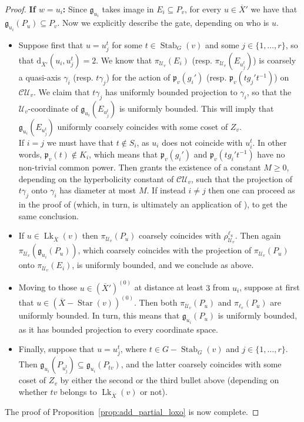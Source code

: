 \documentclass[svgnames]{amsart}
\theoremstyle{plain}
\theoremstyle{definition}
\newcommand{\C}{\mathcal C}
\newcommand{\ov}[1]{\overline{#1}}
\newcommand{\U}{\mathcal{U}}
\newcommand{\dist}{\mathrm{d}}
\newcommand{\link}{\operatorname{Lk}}
\newcommand{\Stab}[2]{\operatorname{Stab}_{#1}(#2)}
\newcommand{\gate}{\mathfrak{g}}
\newcommand{\p}{\mathfrak{p}}
\begin{document}
\begin{proof}
\par\medskip
\textbf{If $w=u_i$:} Since $\gate_{u_i}$ takes image in $E_i\subseteq P_v$, for every $u\in\ov{X}'$ we have that $\gate_{u_i}(P_u)\subseteq P_v$. Now we explicitly describe the gate, depending on who is $u$.
\begin{itemize}
    \item Suppose first that $u=u^t_j$ for some $t\in\Stab{G}{v}$ and some $j\in\{1,\ldots, r\}$, so that $\dist_{\ov X'}(u_i, u_j^t)=2$. We know that $\pi_{\U_v}(E_i)$ (resp. $\pi_{\U_v}(E_{u^t_j})$) is coarsely a quasi-axis $\gamma_i$ (resp. $t\gamma_j$) for the action of $\p_v(g_i')$ (resp. $\p_v(tg_j't^{-1})$) on $\C \U_v$. We claim that $t\gamma_j$ has uniformly bounded projection to $\gamma_i$, so that the $\U_v$-coordinate of $\gate_{u_i}(E_{u^t_j})$ is uniformly bounded. This will imply that $\gate_{u_i}(E_{u^t_j})$ uniformly coarsely coincides with some coset of $Z_v$. 
    \\
    If $i=j$  we must have that $t\not\in S_i$, as $u_i$ does not coincide with $u_i^t$. In other words, $\p_v(t)\not \in K_i$, which means that $\p_v(g_i')$ and $\p_v(tg_i't^{-1})$ have no non-trivial common power. Then \cite[Lemma 6.7]{DGO} grants the existence of a constant $M\ge 0$, depending on the hyperbolicity constant of $\C\U_v$, such that the projection of $t\gamma_j$ onto $\gamma_i$ has diameter at most $M$. If instead $i\neq j$ then one can proceed as in the proof of \cite[Theorem 6.8]{DGO} (which, in turn, is ultimately an application of \cite[Lemma 6.7]{DGO}), to get the same conclusion.
    \item If $u\in\link_{\ov X}(v)$ then $\pi_{\U_v}(P_u)$ coarsely coincides with $\rho^{\ell_u}_{\U_v}$. Then again $\pi_{\U_v}(\gate_{u_i}(P_u))$, which coarsely coincides with the projection of $\pi_{\U_v}(P_u)$ onto $\pi_{\U_v}(E_i)$, is uniformly bounded, and we conclude as above.  
    \item Moving to those $u\in(\ov X')^{(0)}$ at distance at least $3$ from $u_i$, suppose at first that $u\in(\ov{X}-\operatorname{Star}(v))^{(0)}$. Then both $\pi_{\U_v}(P_u)$ and $\pi_{\ell_v}(P_u)$ are uniformly bounded. In turn, this means that $\gate_{u_i}(P_u)$ is uniformly bounded, as it has bounded projection to every coordinate space.
    \item Finally, suppose that $u=u^t_j$, where $t\in G-\Stab{G}{v}$ and $j\in\{1, \ldots, r\}$. Then $\gate_{u_i}(P_{u^t_j})\subseteq \gate_{u_i}(P_{tv})$, and the latter coarsely coincides with some coset of $Z_v$ by either the second or the third bullet above (depending on whether $tv$ belongs to $\link_{\ov X}(v)$ or not). 
\end{itemize}
The proof of Proposition~\ref{prop:add_partial_loxo} is now complete.
\end{proof}
\end{document}
